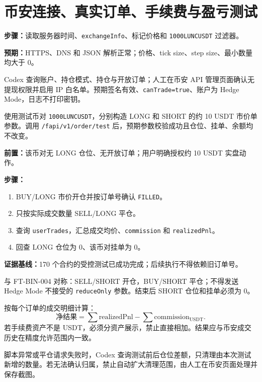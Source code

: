 \section{币安连接、真实订单、手续费与盈亏测试}


\textbf{步骤：}读取服务器时间、\texttt{exchangeInfo}、标记价格和 \texttt{1000LUNCUSDT} 过滤器。\par
\textbf{预期：}HTTPS、DNS 和 JSON 解析正常；价格、tick size、step size、最小数量均大于 0。


Codex 查询账户、持仓模式、持仓与开放订单；人工在币安 API 管理页面确认无提现权限并启用 IP 白名单。预期签名有效、\texttt{canTrade=true}、账户为 Hedge Mode，日志不打印密钥。


使用测试币对 \texttt{1000LUNCUSDT}，分别构造 LONG 和 SHORT 的约 10 USDT 市价单参数。调用 \texttt{/fapi/v1/}\allowbreak\texttt{order/test} 后，预期参数校验成功且仓位、挂单、余额均不改变。


\textbf{前置：}该币对无 LONG 仓位、无开放订单；用户明确授权约 10 USDT 实盘动作。\par
\textbf{步骤：}
\begin{enumerate}
  \item BUY/LONG 市价开仓并按订单号确认 \texttt{FILLED}。
  \item 只按实际成交数量 SELL/LONG 平仓。
  \item 查询 \texttt{userTrades}，汇总成交均价、\texttt{commission} 和 \texttt{realizedPnl}。
  \item 回查 LONG 仓位为 0、该币对挂单为 0。
\end{enumerate}
\textbf{证据基线：}170 个合约的受控测试已成功完成；后续执行不得依赖旧订单号。


与 FT-BIN-004 对称：SELL/SHORT 开仓，BUY/SHORT 平仓；不得发送 Hedge Mode 不接受的 \texttt{reduceOnly} 参数。结束后 SHORT 仓位和挂单必须为 0。


按每个订单的成交明细计算：
\[
  \text{净结果}=\sum \text{realizedPnl}-\sum \text{commission}_{\mathrm{USDT}}.
\]
若手续费资产不是 USDT，必须分资产展示，禁止直接相加。结果应与币安成交历史在精度允许范围内一致。


脚本异常或平仓请求失败时，Codex 查询测试前后仓位差额，只清理由本次测试新增的数量。若无法确认归属，禁止自动扩大清理范围，由人工在币安页面处理并保存截图。
